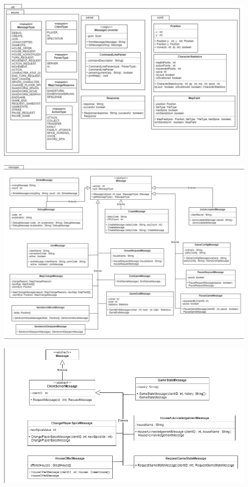\documentclass[12pt]{article}
\begin{document}
\begin{center}
\includegraphics[width=0.95\textwidth]{images/Netzwerk-Util-Klassendiagramm}
\label{fig:Netzwerk-Util-Klassendiagramm}

\includegraphics[width=0.95\textwidth]{images/Netzwerk-Messages-Klassendiagramm}
\label{fig:Netzwerk-Messages-Klassendiagramm}

\includegraphics[width=0.95\textwidth]{images/Netzwerk-Messages-Klassendiagramm 2}
\label{fig:Netzwerk-Messages2-Klassendiagramm}


\end{center}
\end{document}
